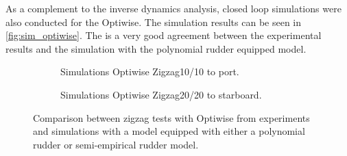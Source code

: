 As a complement to the inverse dynamics analysis, closed loop simulations were also conducted for the Optiwise. The simulation results can be seen in \autoref{fig:sim_optiwise}. The is a very good agreement between the experimental results and the simulation with the polynomial rudder equipped model. 
\begin{figure}[h]
     \centering
     \begin{subfigure}[b]{\textwidth}
         \centering
         
        \caption{Simulations Optiwise Zigzag10/10 to port.}
        \label{fig:sim_wPCC_10}
     \end{subfigure}
     \vfill
     \begin{subfigure}[b]{\textwidth}
         
        \caption{Simulations Optiwise Zigzag20/20 to starboard.}
        \label{fig:sim_wPCC_20}
     \end{subfigure}
        \caption{Comparison between zigzag tests with Optiwise from experiments and simulations with a model equipped with either a polynomial rudder or semi-empirical rudder model.}
        \label{fig:sim_optiwise}
\end{figure}